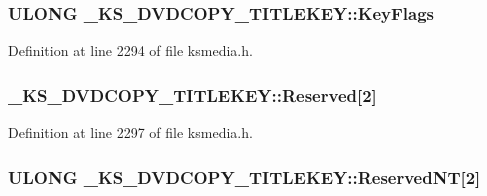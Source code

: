\subsubsection[{\texorpdfstring{Key\+Flags}{KeyFlags}}]{\setlength{\rightskip}{0pt plus 5cm}U\+L\+O\+NG \+\_\+\+K\+S\+\_\+\+D\+V\+D\+C\+O\+P\+Y\+\_\+\+T\+I\+T\+L\+E\+K\+E\+Y\+::\+Key\+Flags}\hypertarget{struct___k_s___d_v_d_c_o_p_y___t_i_t_l_e_k_e_y_a67c5ab03de815bfdb8a590206126bce4}{}\label{struct___k_s___d_v_d_c_o_p_y___t_i_t_l_e_k_e_y_a67c5ab03de815bfdb8a590206126bce4}


Definition at line 2294 of file ksmedia.\+h.

\subsubsection[{\texorpdfstring{Reserved}{Reserved}}]{ \+\_\+\+K\+S\+\_\+\+D\+V\+D\+C\+O\+P\+Y\+\_\+\+T\+I\+T\+L\+E\+K\+E\+Y\+::\+Reserved\mbox{[}2\mbox{]}}\hypertarget{struct___k_s___d_v_d_c_o_p_y___t_i_t_l_e_k_e_y_a2f03fc09f32b0884effcbfd5266d22e4}{}\label{struct___k_s___d_v_d_c_o_p_y___t_i_t_l_e_k_e_y_a2f03fc09f32b0884effcbfd5266d22e4}


Definition at line 2297 of file ksmedia.\+h.

\subsubsection[{\texorpdfstring{Reserved\+NT}{ReservedNT}}]{\setlength{\rightskip}{0pt plus 5cm}U\+L\+O\+NG \+\_\+\+K\+S\+\_\+\+D\+V\+D\+C\+O\+P\+Y\+\_\+\+T\+I\+T\+L\+E\+K\+E\+Y\+::\+Reserved\+NT\mbox{[}2\mbox{]}}\hypertarget{struct___k_s___d_v_d_c_o_p_y___t_i_t_l_e_k_e_y_a5faf97e025ce841b170ddce40586e27c}{}\label{struct___k_s___d_v_d_c_o_p_y___t_i_t_l_e_k_e_y_a5faf97e025ce841b170ddce40586e27c}


